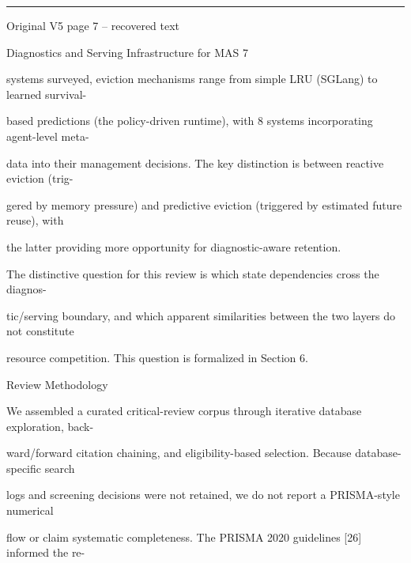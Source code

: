 \par\smallskip\noindent\rule{\textwidth}{0.4pt}\par{\sffamily\footnotesize Original V5 page 7 -- recovered text}\par\begin{flushleft}\footnotesize\ttfamily
\par\smallskip
\par\smallskip
\noindent Diagnostics and Serving Infrastructure for MAS 7\par
\par\smallskip
\par\smallskip
\par\smallskip
\noindent systems surveyed, eviction mechanisms range from simple LRU (SGLang) to learned survival-\par
\noindent based predictions (the policy-driven runtime), with 8 systems incorporating agent-level meta-\par
\noindent data into their management decisions. The key distinction is between reactive eviction (trig-\par
\noindent gered by memory pressure) and predictive eviction (triggered by estimated future reuse), with\par
\noindent the latter providing more opportunity for diagnostic-aware retention.\par
\noindent  The distinctive question for this review is which state dependencies cross the diagnos-\par
\noindent tic/serving boundary, and which apparent similarities between the two layers do not constitute\par
\noindent resource competition. This question is formalized in Section 6.\par
\par\smallskip
\par\smallskip
{} Review Methodology\par
\noindent We assembled a curated critical-review corpus through iterative database exploration, back-\par
\noindent ward/forward citation chaining, and eligibility-based selection. Because database-specific search\par
\noindent logs and screening decisions were not retained, we do not report a PRISMA-style numerical\par
\noindent flow or claim systematic completeness. The PRISMA 2020 guidelines [26] informed the re-\par

\end{flushleft}
